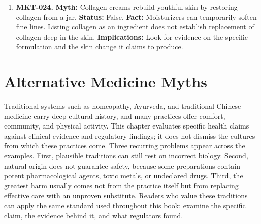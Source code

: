 \documentclass[11pt,oneside]{book}
\begin{document}
\begin{enumerate}[leftmargin=0pt,labelwidth=0pt,labelsep=0pt,itemindent=0pt]
\textbf{Fact:} Cellulite is common dimpling related to fat and connective tissue. Some products temporarily alter its appearance, but lasting elimination by a cream has not been established. \cite{ref112}\newline
\textbf{Implications:} Cellulite itself requires no treatment. Ask how long any cosmetic change lasts.
\item[] \textbf{MKT-024.} \textbf{Myth:} Collagen creams rebuild youthful skin by restoring collagen from a jar.\newline
\textbf{Status:} False.\newline
\textbf{Fact:} Moisturizers can temporarily soften fine lines. Listing collagen as an ingredient does not establish replacement of collagen deep in the skin. \cite{ref468}\newline
\textbf{Implications:} Look for evidence on the specific formulation and the skin change it claims to produce.

\end{enumerate}

\chapter{Alternative Medicine Myths}
Traditional systems such as homeopathy, Ayurveda, and traditional Chinese medicine carry deep cultural history, and many practices offer comfort, community, and physical activity. This chapter evaluates specific health claims against clinical evidence and regulatory findings; it does not dismiss the cultures from which these practices come. Three recurring problems appear across the examples. First, plausible traditions can still rest on incorrect biology. Second, natural origin does not guarantee safety, because some preparations contain potent pharmacological agents, toxic metals, or undeclared drugs. Third, the greatest harm usually comes not from the practice itself but from replacing effective care with an unproven substitute. Readers who value these traditions can apply the same standard used throughout this book: examine the specific claim, the evidence behind it, and what regulators found.
\end{document}
